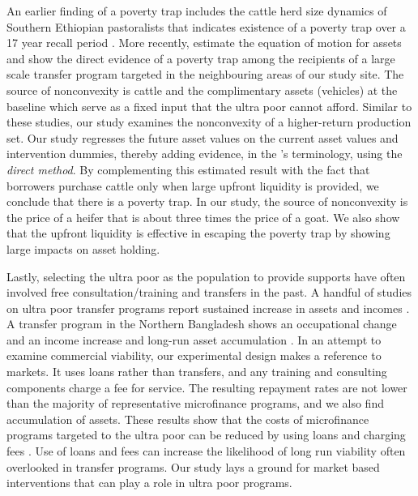 	An earlier finding of a poverty trap includes the cattle herd size dynamics of Southern Ethiopian pastoralists that indicates existence of a poverty trap over a 17 year recall period \citep{Lybbertetal2004}. More recently, \citet{Balboni2020} estimate the equation of motion for assets and show the direct evidence of a poverty trap among the recipients of a large scale transfer program targeted in the neighbouring areas of our study site. The source of nonconvexity is cattle and the complimentary assets (vehicles) at the baseline which serve as a fixed input that the ultra poor cannot afford. Similar to these studies, our study examines the nonconvexity of a higher-return production set. Our study regresses the future asset values on the current asset values and intervention dummies, thereby adding evidence, in the \citet{BarrettGargMcBride2016}'s terminology, using the \textit{direct method}. %
	By complementing this estimated result with the fact that borrowers purchase cattle only when large upfront liquidity is provided, we conclude that there is a poverty trap. In our study, the source of nonconvexity is the price of a heifer that is about three times the price of a goat. We also show that the upfront liquidity is effective in escaping the poverty trap by showing large impacts on asset holding.

	Lastly, selecting the ultra poor as the population to provide supports have often involved free consultation/training and transfers in the past. A handful of studies on ultra poor transfer programs report sustained increase in assets and incomes \citep{Blattman2014, BanerjeeetalScience2015, Blattmanetal2016, HaushoferShapiro2016}. A transfer program in the Northern Bangladesh shows an occupational change and an income increase \citep{BandieraBRAC2017} and long-run asset accumulation \citep{Balboni2020}. %
	In an attempt to examine commercial viability, our experimental design makes a reference to markets. It uses loans rather than transfers, and any training and consulting components charge a fee for service. The resulting repayment rates are not lower than the majority of representative microfinance programs, and we also find accumulation of assets. These results show that the costs of microfinance programs targeted to the ultra poor can be reduced by using loans and charging fees . Use of loans and fees can increase the likelihood of long run viability often overlooked in transfer programs.\label{PageOfCostsMFReduced} Our study lays a ground for market based interventions that can play a role in ultra poor programs.


